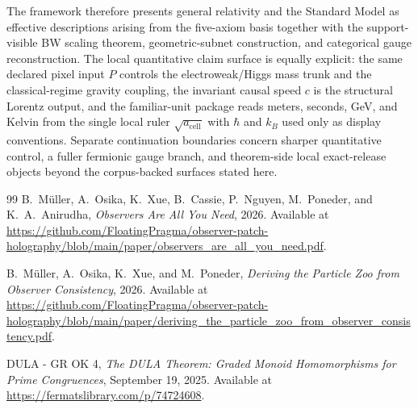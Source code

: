 \documentclass[11pt]{article}
\begin{document}
The framework therefore presents general relativity and the Standard Model as effective descriptions arising from the five-axiom basis together with the support-visible BW scaling theorem, geometric-subnet construction, and categorical gauge reconstruction. The local quantitative claim surface is equally explicit: the same declared pixel input \(P\) controls the electroweak/Higgs mass trunk and the classical-regime gravity coupling, the invariant causal speed \(c\) is the structural Lorentz output, and the familiar-unit package reads meters, seconds, GeV, and Kelvin from the single local ruler \(\sqrt{a_{\mathrm{cell}}}\) with \(\hbar\) and \(k_B\) used only as display conventions. Separate continuation boundaries concern sharper quantitative control, a fuller fermionic gauge branch, and theorem-side local exact-release objects beyond the corpus-backed surfaces stated here.

\appendix


\begin{thebibliography}{99}
B.~M\"uller, A.~Osika, K.~Xue, B.~Cassie, P.~Nguyen, M.~Poneder, and K.~A.~Anirudha,
\emph{Observers Are All You Need},
2026.
Available at \url{https://github.com/FloatingPragma/observer-patch-holography/blob/main/paper/observers_are_all_you_need.pdf}.

B.~M\"uller, A.~Osika, K.~Xue, and M.~Poneder,
\emph{Deriving the Particle Zoo from Observer Consistency},
2026.
Available at \url{https://github.com/FloatingPragma/observer-patch-holography/blob/main/paper/deriving_the_particle_zoo_from_observer_consistency.pdf}.

DULA - GR OK 4,
\emph{The DULA Theorem: Graded Monoid Homomorphisms for Prime Congruences},
September 19, 2025.
Available at \url{https://fermatslibrary.com/p/74724608}.


\end{thebibliography}
\end{document}
